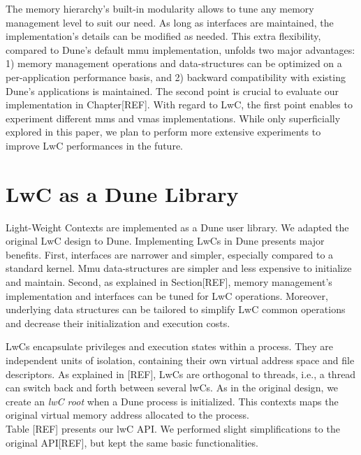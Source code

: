 The memory hierarchy's built-in modularity allows to tune any memory management level to suit our need.
As long as interfaces are maintained, the implementation's details can be modified as needed.
This extra flexibility, compared to Dune's default mmu implementation, unfolds two major advantages: 1) memory management operations and data-structures can be optimized on a per-application performance basis, and 2) backward compatibility with existing Dune's applications is maintained.
The second point is crucial to evaluate our implementation in Chapter[REF].
With regard to LwC, the first point enables to experiment different mms and vmas implementations.
While only superficially explored in this paper, we plan to perform more extensive experiments to improve LwC performances in the future.

\section{LwC as a Dune Library}
Light-Weight Contexts are implemented as a Dune user library.
We adapted the original LwC design to Dune.
Implementing LwCs in Dune presents major benefits.
First, interfaces are narrower and simpler, especially compared to a standard kernel.
Mmu data-structures are simpler and less expensive to initialize and maintain. 
Second, as explained in Section[REF], memory management's implementation and interfaces can be tuned for LwC operations.
Moreover, underlying data structures can be tailored to simplify LwC common operations and decrease their initialization and execution costs.

LwCs encapsulate privileges and execution states within a process.
They are independent units of isolation, containing their own virtual address space and file descriptors.
As explained in [REF], LwCs are orthogonal to threads, i.e., a thread can switch back and forth between several lwCs.
As in the original design, we create an \textit{lwC root} when a Dune process is initialized.
This contexts maps the original virtual memory address allocated to the process.\\
Table [REF] presents our lwC API.
We performed slight simplifications to the original API[REF], but kept the same basic functionalities.

